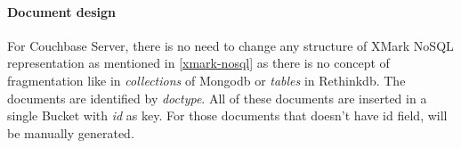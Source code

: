 
\paragraph{Document design}
For Couchbase Server, there is no need to change any structure of XMark NoSQL representation as mentioned in \ref{xmark-nosql} as there is no concept of fragmentation like in \textit{collections} of Mongodb or \textit{tables} in Rethinkdb. The documents are identified by \textit{doctype}. All of these documents are inserted in a single Bucket with \textit{id} as key. For those documents that doesn't have id field, will be manually generated.


